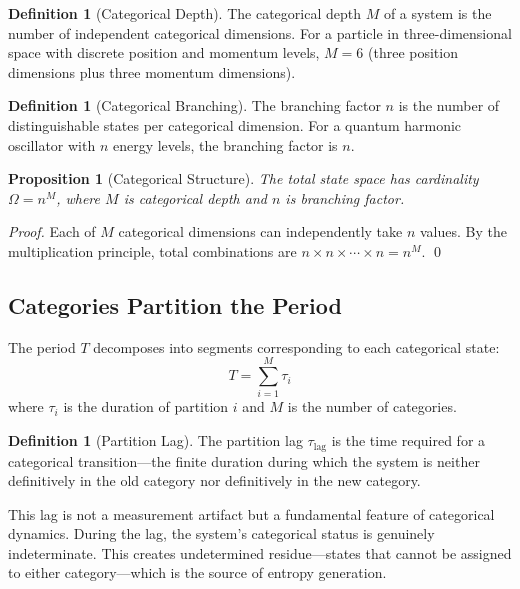 \documentclass[twocolumn,10pt]{article}
\newtheorem{proposition}[theorem]{Proposition}
\theoremstyle{definition}
\newtheorem{definition}[theorem]{Definition}
\theoremstyle{remark}
\begin{document}
\begin{definition}[Categorical Depth]
\label{def:depth}
The categorical depth $M$ of a system is the number of independent categorical dimensions. For a particle in three-dimensional space with discrete position and momentum levels, $M = 6$ (three position dimensions plus three momentum dimensions).
\end{definition}

\begin{definition}[Categorical Branching]
\label{def:branching}
The branching factor $n$ is the number of distinguishable states per categorical dimension. For a quantum harmonic oscillator with $n$ energy levels, the branching factor is $n$.
\end{definition}

\begin{proposition}[Categorical Structure]
\label{prop:structure}
The total state space has cardinality $\Omega = n^M$, where $M$ is categorical depth and $n$ is branching factor.
\end{proposition}

\begin{proof}
Each of $M$ categorical dimensions can independently take $n$ values. By the multiplication principle, total combinations are $n \times n \times \cdots \times n = n^M$. \qed
\end{proof}

\subsection{Categories Partition the Period}

The period $T$ decomposes into segments corresponding to each categorical state:
\begin{equation}
T = \sum_{i=1}^{M} \tau_i
\label{eq:period_decomposition}
\end{equation}
where $\tau_i$ is the duration of partition $i$ and $M$ is the number of categories.

\begin{definition}[Partition Lag]
\label{def:partition_lag}
The partition lag $\tau_{\text{lag}}$ is the time required for a categorical transition---the finite duration during which the system is neither definitively in the old category nor definitively in the new category.
\end{definition}

This lag is not a measurement artifact but a fundamental feature of categorical dynamics. During the lag, the system's categorical status is genuinely indeterminate. This creates undetermined residue---states that cannot be assigned to either category---which is the source of entropy generation.
\end{document}
